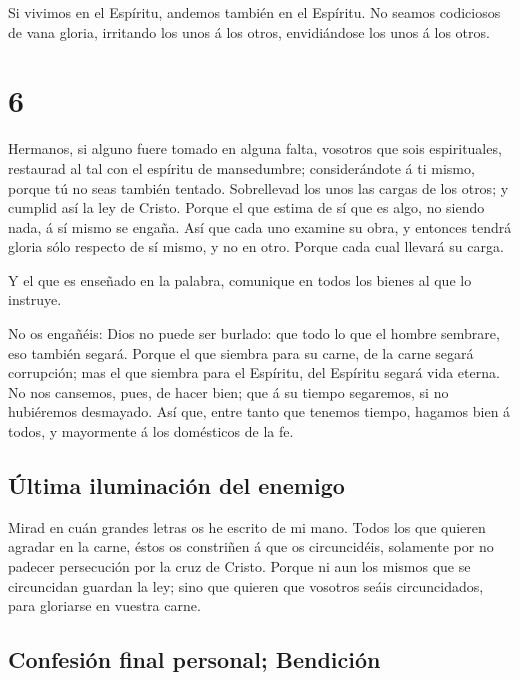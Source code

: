  Si vivimos en el Espíritu, andemos también en el
Espíritu.  No seamos codiciosos de vana gloria, irritando
los unos á los otros, envidiándose los unos á los otros.

\hypertarget{section-5}{%
\section{6}\label{section-5}}

 Hermanos, si alguno fuere tomado en alguna falta,
vosotros que sois espirituales, restaurad al tal con el espíritu de
mansedumbre; considerándote á ti mismo, porque tú no seas también
tentado.  Sobrellevad los unos las cargas de los otros; y
cumplid así la ley de Cristo.  Porque el que estima de sí
que es algo, no siendo nada, á sí mismo se engaña.  Así
que cada uno examine su obra, y entonces tendrá gloria sólo respecto de
sí mismo, y no en otro.  Porque cada cual llevará su
carga.

 Y el que es enseñado en la palabra, comunique en todos
los bienes al que lo instruye.

 No os engañéis: Dios no puede ser burlado: que todo lo
que el hombre sembrare, eso también segará.  Porque el que
siembra para su carne, de la carne segará corrupción; mas el que siembra
para el Espíritu, del Espíritu segará vida eterna.  No nos
cansemos, pues, de hacer bien; que á su tiempo segaremos, si no
hubiéremos desmayado.  Así que, entre tanto que tenemos
tiempo, hagamos bien á todos, y mayormente á los domésticos de la fe.

\hypertarget{uxfaltima-iluminaciuxf3n-del-enemigo}{%
\subsection{Última iluminación del
enemigo}\label{uxfaltima-iluminaciuxf3n-del-enemigo}}

 Mirad en cuán grandes letras os he escrito de mi mano.
 Todos los que quieren agradar en la carne, éstos os
constriñen á que os circuncidéis, solamente por no padecer persecución
por la cruz de Cristo.  Porque ni aun los mismos que se
circuncidan guardan la ley; sino que quieren que vosotros seáis
circuncidados, para gloriarse en vuestra carne.

\hypertarget{confesiuxf3n-final-personal-bendiciuxf3n}{%
\subsection{Confesión final personal;
Bendición}\label{confesiuxf3n-final-personal-bendiciuxf3n}}

